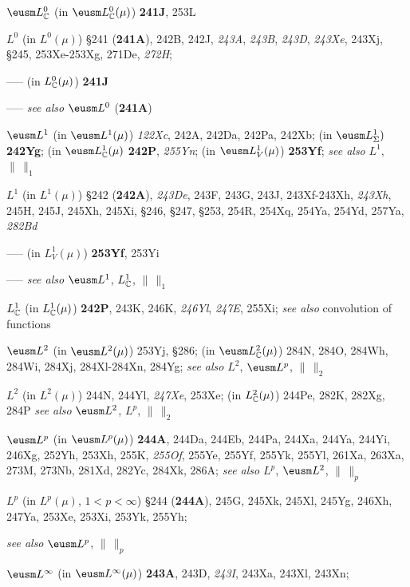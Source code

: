 $\eusm L^0_{\Bbb C}$ (in $\eusm L^0_{\Bbb C}(\mu)$) {\bf 241J}, 253L


$L^0$ (in $L^0(\mu)$) \S241 ({\bf 241A}), 242B, 242J, {\it 243A},
{\it 243B}, {\it 243D}, {\it 243Xe}, 243Xj,
\S245, 253Xe-253Xg, 
271De, {\it 272H}; 


----- (in $L^0_{\Bbb C}(\mu)$) {\bf 241J}






----- {\it see also} $\eusm L^0$ ({\bf 241A})


$\eusm L^1$ (in $\eusm L^1(\mu)$) {\it 122Xc}, 242A, 242Da, 242Pa,
242Xb; 
  (in $\eusm L^1_{\Sigma})$ {\bf 242Yg};
  (in $\eusm L^1_{\Bbb C}(\mu)$ {\bf 242P}, {\it 255Yn};
  (in $\eusm L^1_V(\mu)$) {\bf 253Yf};
  {\it see also} $L^1$, $\|\,\|_1$
  

$L^1$ (in $L^1(\mu)$) \S242 ({\bf 242A}),
{\it 243De}, 243F, 243G, 243J, 243Xf-243Xh, 
{\it 243Xh},
245H, 245J, 245Xh, 245Xi, \S246,
\S247, \S253, 254R, 254Xq, 254Ya, 254Yd, 257Ya, {\it 282Bd} 


----- (in $L^1_V(\mu)$) {\bf 253Yf}, 253Yi




----- {\it see also} $\eusm L^1$, $L^1_{\Bbb C}$, $\|\,\|_1$


$L^1_{\Bbb C}$ (in $L^1_{\Bbb C}(\mu)$) {\bf 242P}, 243K,
246K, {\it 246Yl}, {\it 247E}, 255Xi;
  {\it see also} convolution of functions


$\eusm L^2$ (in $\eusm L^2(\mu)$) 253Yj, \S286;  
  (in $\eusm L^2_{\Bbb C}(\mu)$) 284N, 284O, 284Wh, 284Wi, 284Xj,
284Xl-284Xn, 
284Yg;
  {\it see also} $L^2$, $\eusm L^p$, $\|\,\|_2$


$L^2$ (in $L^2(\mu)$) 244N, 244Yl, {\it 247Xe}, 253Xe; 
  (in $L^2_{\Bbb C}(\mu)$) 244Pe, 282K, 282Xg, 284P
  {\it see also} $\eusm L^2$, $L^p$, $\|\,\|_2$



$\eusm L^p$ (in $\eusm L^p(\mu)$) {\bf 244A}, 244Da, 244Eb, 244Pa,
244Xa, 244Ya, 244Yi,
246Xg, 252Yh, 253Xh, 255K, {\it 255Of}, 255Ye, 255Yf, 255Yk, 255Yl,
261Xa, 263Xa, 273M, 273Nb, 281Xd, 282Yc, 284Xk, 286A; 
  {\it see also} $L^p$, $\eusm L^2$, $\|\,\|_p$


$L^p$ (in $L^p(\mu)$, $1<p<\infty$) \S244 ({\bf 244A}), 245G, 245Xk,
245Xl, 245Yg, 246Xh, 247Ya, 253Xe, 253Xi, 253Yk, 255Yh; 
  
  
  
  {\it see also} $\eusm L^p$, $\|\,\|_p$


$\eusm L^{\infty}$ (in $\eusm L^{\infty}(\mu)$) {\bf 243A}, 243D,
{\it 243I}, 243Xa, 243Xl, 243Xn;
  

